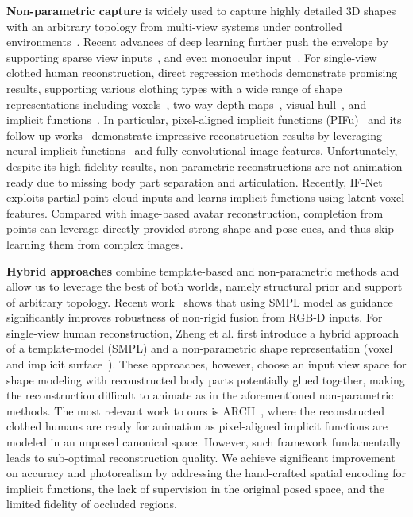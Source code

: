 \documentclass[10pt,twocolumn,letterpaper]{article}
\begin{document}
\textbf{Non-parametric capture} is widely used to capture highly detailed 3D shapes with an arbitrary topology from multi-view systems under controlled environments~\cite{MVVisualHullTOG00, MVDetailPoseShapeCVPR07, MVArticulatedMeshAnimeTOG08, tung08, MVSkelSurfMocapCVPR09, MVPhotoStereoTOG09, MVStereopsisTOG10, MVShadeMocapECCV12, tung09, tung12}. Recent advances of deep learning further push the envelope by supporting sparse view inputs~\cite{gilbert2018volumetric, huang2018deep}, and even monocular input~\cite{li2020monocular}. For single-view clothed human reconstruction, direct regression methods demonstrate promising results, supporting various clothing types with a wide range of shape representations including voxels~\cite{varol18_bodynet, VolumeRegECCVW2018}, two-way depth maps~\cite{gabeur2019moulding, smith2019facsimile}, visual hull~\cite{SiCloPeCVPR19}, and implicit functions~\cite{PIFuICCV19, saito2020pifuhd, he2020geopifu}. In particular, pixel-aligned implicit functions (PIFu)~\cite{PIFuICCV19} and its follow-up works~\cite{saito2020pifuhd, he2020geopifu} demonstrate impressive reconstruction results by leveraging neural implicit functions~\cite{OccupancyNetCVPR19, chen2019implicit_decoder, Park_2019_CVPR} and fully convolutional image features. Unfortunately, despite its high-fidelity results, non-parametric reconstructions are not animation-ready due to missing body part separation and articulation. Recently, IF-Net~\cite{chibane20ifnet} exploits partial point cloud inputs and learns implicit functions using latent voxel features. Compared with image-based avatar reconstruction, completion from points can leverage directly provided strong shape and pose cues, and thus skip learning them from complex images.

\textbf{Hybrid approaches} combine template-based and non-parametric methods and allow us to leverage the best of both worlds, namely structural prior and support of arbitrary topology. Recent work~\cite{bharat20ipnet} shows that using SMPL model as guidance significantly improves robustness of non-rigid fusion from RGB-D inputs. For single-view human reconstruction, Zheng et al. first introduce a hybrid approach of a template-model (SMPL) and a non-parametric shape representation (voxel~\cite{DeepHumanICCV19} and implicit surface~\cite{Zerong2020PaMIR}). These approaches, however, choose an input view space for shape modeling with reconstructed body parts potentially glued together, making the reconstruction difficult to animate as in the aforementioned non-parametric methods. The most relevant work to ours is ARCH~\cite{huang2020arch}, where the reconstructed clothed humans are ready for animation as pixel-aligned implicit functions are modeled in an unposed canonical space. However, such framework fundamentally leads to sub-optimal reconstruction quality. We achieve significant improvement on accuracy and photorealism by addressing the hand-crafted spatial encoding for implicit functions, the lack of supervision in the original posed space, and the limited fidelity of occluded regions.
\end{document}
